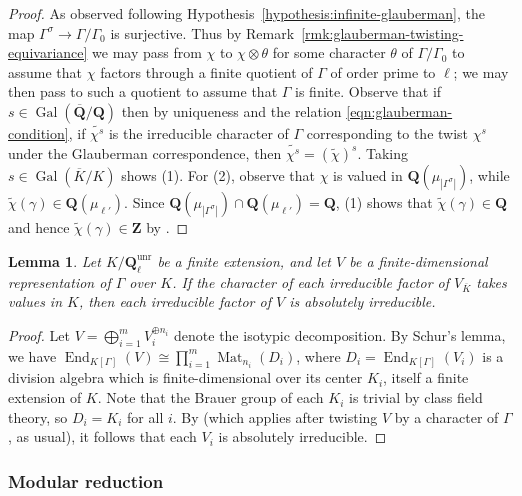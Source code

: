 \documentclass[reqno]{amsart}
\numberwithin{equation}{subsection}
\newcommand{\Q}{\mathbf{Q}}
\newcommand{\Z}{\mathbf{Z}}
\newcommand{\Gal}{\operatorname{Gal}}
\newcommand{\Mat}{\operatorname{Mat}}
\newcommand{\ol}[1]{\overline{#1}}
\DeclareMathOperator{\End}{End}
\newtheorem{lemma}[thm]{Lemma}
\theoremstyle{remark}
\numberwithin{equation}{subsection}
\numberwithin{figure}{subsection}
\begin{document}
\begin{proof}
    As observed following Hypothesis~\ref{hypothesis:infinite-glauberman}, the map $\Gamma^\sigma \to \Gamma/\Gamma_0$ is surjective. Thus by Remark~\ref{rmk:glauberman-twisting-equivariance} we may pass from $\chi$ to $\chi \otimes \theta$ for some character $\theta$ of $\Gamma/\Gamma_0$ to assume that $\chi$ factors through a finite quotient of $\Gamma$ of order prime to $\ell$; we may then pass to such a quotient to assume that $\Gamma$ is finite. Observe that if $s \in \Gal(\ol\Q/\Q)$ then by uniqueness and the relation \eqref{eqn:glauberman-condition}, if $\widetilde{\chi^s}$ is the irreducible character of $\Gamma$ corresponding to the twist $\chi^s$ under the Glauberman correspondence, then $\widetilde{\chi^s} = (\widetilde{\chi})^s$. Taking $s \in \Gal(\ol K/K)$ shows (1). For (2), observe that $\chi$ is valued in $\Q(\mu_{|\Gamma^\sigma|})$, while $\widetilde\chi(\gamma) \in \Q(\mu_{\ell'})$. Since $\Q(\mu_{|\Gamma^\sigma|}) \cap \Q(\mu_{\ell'}) = \Q$, (1) shows that $\widetilde\chi(\gamma) \in \Q$ and hence $\widetilde\chi(\gamma) \in \Z$ by \cite[\S6.5, Proposition~15]{Serre77}.
\end{proof}

\begin{lemma}\label{lemma:character-values-irreducible-factors}
    Let $K/\Q_\ell^{\mathrm{unr}}$ be a finite extension, and let $V$ be a finite-dimensional representation of $\Gamma$ over $K$. If the character of each irreducible factor of $V_{\ol K}$ takes values in $K$, then each irreducible factor of $V$ is absolutely irreducible.
\end{lemma}

\begin{proof}
    Let $V= \bigoplus_{i=1}^m V_i^{\oplus n_i}$ denote the isotypic decomposition. By Schur's lemma, we have $\End_{K[\Gamma]}(V) \cong \prod_{i=1}^m \Mat_{n_i}(D_i)$, where $D_i = \End_{K[\Gamma]}(V_i)$ is a division algebra which is finite-dimensional over its center $K_i$, itself a finite extension of $K$. Note that the Brauer group of each $K_i$ is trivial by class field theory, so $D_i = K_i$ for all $i$. By \cite[\S12.2, Proposition~35]{Serre77} (which applies after twisting $V$ by a character of $\Gamma$, as usual), it follows that each $V_i$ is absolutely irreducible.
\end{proof}

\subsubsection{Modular reduction}
\end{document}
